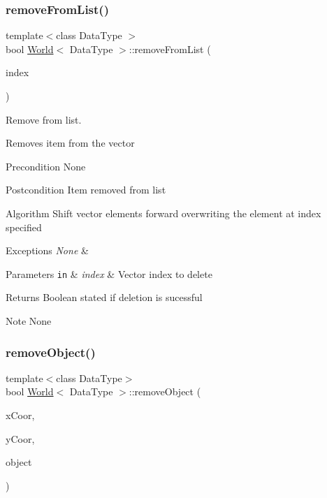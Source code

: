 \subsubsection{\texorpdfstring{remove\+From\+List()}{removeFromList()}}
{\footnotesize\ttfamily template$<$class Data\+Type $>$ \\
bool \hyperlink{class_world}{World}$<$ Data\+Type $>$\+::remove\+From\+List (\begin{DoxyParamCaption}\item[{int}]{index }\end{DoxyParamCaption})\hspace{0.3cm}{\ttfamily [private]}}



Remove from list. 

Removes item from the vector

\begin{DoxyPrecond}{Precondition}
None
\end{DoxyPrecond}
\begin{DoxyPostcond}{Postcondition}
Item removed from list
\end{DoxyPostcond}
\begin{DoxyParagraph}{Algorithm}
Shift vector elements forward overwriting the element at index specified
\end{DoxyParagraph}

\begin{DoxyExceptions}{Exceptions}
{\em None} & \\
\hline
\end{DoxyExceptions}

\begin{DoxyParams}[1]{Parameters}
\mbox{\tt in}  & {\em index} & Vector index to delete\\
\hline
\end{DoxyParams}
\begin{DoxyReturn}{Returns}
Boolean stated if deletion is sucessful
\end{DoxyReturn}
\begin{DoxyNote}{Note}
None 
\end{DoxyNote}
\hypertarget{class_world_a6ece0e52d09aae5aaea04eec740d8f07}{}\label{class_world_a6ece0e52d09aae5aaea04eec740d8f07} 
\subsubsection{\texorpdfstring{remove\+Object()}{removeObject()}}
{\footnotesize\ttfamily template$<$class Data\+Type$>$ \\
bool \hyperlink{class_world}{World}$<$ Data\+Type $>$\+::remove\+Object (\begin{DoxyParamCaption}\item[{int}]{x\+Coor,  }\item[{int}]{y\+Coor,  }\item[{Data\+Type $\ast$}]{object }\end{DoxyParamCaption})}



